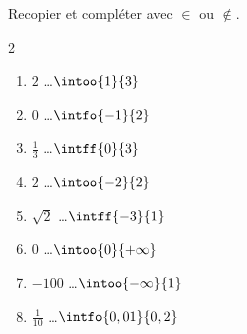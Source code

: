 \begin{exo}{}
	Recopier et compléter avec $\in$ ou $\notin$.
	\vspace*{-2mm}\begin{multicols}{2}
	\begin{enumerate}[itemsep=2mm]
		\item $2$ \dots $\intoo{1}{3}$
		\item $0$ \dots $\intfo{-1}{2}$
		\item $\frac{1}{3}$ \dots $\intff{0}{3}$
		\item $2$ \dots $\intoo{-2}{2}$
		\item $\sqrt{2}$ \dots $\intff{-3}{1}$
		\item $0$ \dots $\intoo{0}{+\infty}$
		\item $-100$ \dots $\intoo{-\infty}{1}$
		\item $\frac{1}{10}$ \dots $\intfo{0,01}{0,2}$
	\end{enumerate}
	\end{multicols}\vspace*{-2mm}
\end{exo}
